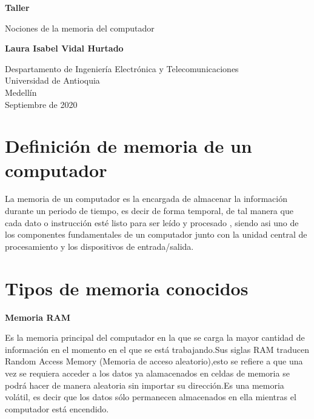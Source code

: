 \documentclass{article}
\begin{document}
\begin{titlepage}
    \begin{center}
        \vspace*{1cm}
            
        \Huge
        \textbf{Taller}
            
        \vspace{0.5cm}
        \LARGE
        Nociones de la memoria del computador
            
        \vspace{1.5cm}
            
        \textbf{Laura Isabel Vidal Hurtado}
            
        \vfill
            
        \vspace{0.8cm}
            
        \Large
        Despartamento de Ingeniería Electrónica y Telecomunicaciones\\
        Universidad de Antioquia\\
        Medellín\\
        Septiembre de 2020
            
    \end{center}
\end{titlepage}

\tableofcontents

\section{Definición de memoria de un computador}

La memoria de un computador es la encargada de almacenar la información durante un periodo de tiempo, es decir de forma temporal, de tal manera que cada dato o instrucción esté listo para ser leído y procesado , siendo asi uno de los componentes fundamentales de un computador junto con la unidad central de procesamiento y los dispositivos de entrada/salida.

\section{Tipos de memoria conocidos} \label{contenido}
\textbf{Memoria RAM}

Es la memoria principal del computador en la que se carga la mayor cantidad de información en el momento en el que se está trabajando.Sus siglas RAM traducen Random Access
Memory (Memoria de acceso aleatorio),esto se refiere a que una vez se requiera acceder a los datos ya alamacenados en celdas de memoria se podrá hacer de manera aleatoria 
sin importar su dirección.Es una memoria volátil, es decir que los datos sólo permanecen almacenados en ella mientras el computador está encendido.
\end{document}
